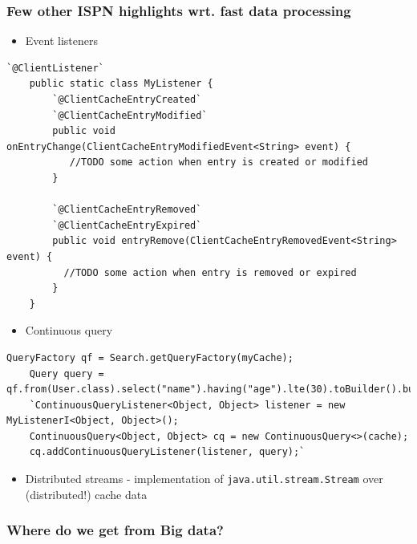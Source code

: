 \documentclass[10pt,utf8]{beamer}
\begin{document}
\begin{frame}[fragile]
	\frametitle{Few other ISPN highlights wrt. fast data processing}
	\begin{itemize}
	 \item Event listeners
	\end{itemize}
	\begin{lstlisting}[style=Java,basicstyle=\tiny\ttfamily]
    `@ClientListener`
    public static class MyListener {
        `@ClientCacheEntryCreated`
        `@ClientCacheEntryModified`
        public void onEntryChange(ClientCacheEntryModifiedEvent<String> event) {
           //TODO some action when entry is created or modified
        }

        `@ClientCacheEntryRemoved`
        `@ClientCacheEntryExpired`
        public void entryRemove(ClientCacheEntryRemovedEvent<String> event) {
          //TODO some action when entry is removed or expired
        }
    }
	\end{lstlisting}
	
	\begin{itemize}
	 \item Continuous query
	\end{itemize}
	\begin{lstlisting}[style=Java,basicstyle=\tiny\ttfamily]
    QueryFactory qf = Search.getQueryFactory(myCache);
    Query query = qf.from(User.class).select("name").having("age").lte(30).toBuilder().build();
    `ContinuousQueryListener<Object, Object> listener = new MyListenerI<Object, Object>();
    ContinuousQuery<Object, Object> cq = new ContinuousQuery<>(cache);
    cq.addContinuousQueryListener(listener, query);`
	\end{lstlisting}
	
	\begin{itemize}
			\item Distributed streams - implementation of \texttt{java.util.stream.Stream} over (distributed!) cache data
		\end{itemize}
\end{frame}

\begin{frame}
	\frametitle{Where do we get from Big data?}
	\vspace{0.5cm}
\end{frame}
\end{document}
